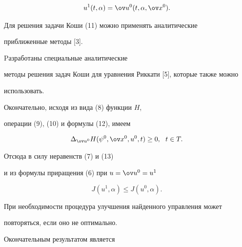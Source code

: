 \begin{equation}


u^1(t,\alpha)=\ov u^0(t,\alpha,\ov x^0).


\end{equation}





\begin{note}


Для решения задачи Коши (11) можно применять аналитические 


приближенные методы [3]. 


Pазработаны специальные аналитические 


методы решения задач Коши для уравнения Риккати [5], которые также можно 


использовать.


\end{note}





Окончательно, исходя из вида (8) функции $H$,


операции (9), (10) и формулы (12), имеем


\begin{equation}


\Delta_{\ov u^0}H(\psi^0,\ov x^0,u^0,t)\geq 0,\ \ t\in T.


\end{equation}


Отсюда в силу неравенств (7) и (13) 


и из формулы приращения (6) при $u=\ov u^0=u^1$


$$


J(u^1,\alpha)\leq J(u^0,\alpha).


$$


При необходимости процедура улучшения найденного управления может


повторяться, если оно не оптимально.


Окончательным результатом является


\medskip





